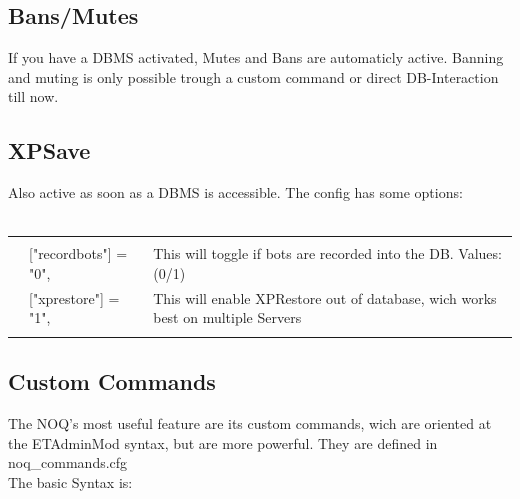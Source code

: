 \documentclass[12pt,a4paper]{article}
\begin{document}
\subsection{Bans/Mutes}
If you have a DBMS activated, Mutes and Bans are automaticly active.
Banning and muting is only possible trough a custom command or direct DB-Interaction till now.

\subsection{XPSave}
Also active as soon as a DBMS is accessible.
The config has some options:
\\
\\
\begin{tabular}{l l|l}
\hline & & \\
& 	["recordbots"] = "0", 	& This will toggle if bots are recorded into the DB. Values:(0/1)\\
& 	["xprestore"] = "1",	& This will enable XPRestore out of database, wich works best on multiple Servers\\
 & &  \\
 \hline
\end{tabular}

\newpage

\subsection{Custom Commands}

The NOQ's most useful feature are its custom commands, wich are oriented at the ETAdminMod syntax, but are more powerful. They are defined in noq\_commands.cfg
\\
The basic Syntax is:
\end{document}

